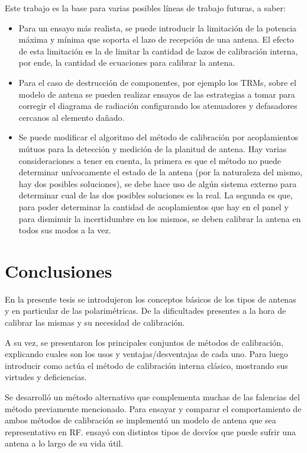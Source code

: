 Este trabajo es la base para varias posibles líneas de trabajo futuras, a saber:
\begin{itemize}
	\item Para un ensayo más realista, se puede introducir la limitación de la potencia máxima y mínima que soporta el lazo 
		de recepción de una antena. El efecto de esta limitación es la de limitar la cantidad de lazos de calibración interna, 
		por ende, la cantidad de ecuaciones para calibrar la antena.
	\item Para el caso de destrucción de componentes, por ejemplo los TRMs, sobre el modelo de antena se pueden realizar ensayos 
		de las estrategias a tomar para corregir el diagrama de radiación configurando los atenuadores y defasadores cercanos al 
		elemento dañado.
	\item Se puede modificar el algoritmo del método de calibración por acoplamientos mútuos para la detección y medición de 
		la planitud de antena. Hay varias consideraciones a tener en cuenta, la primera es que el método no puede determinar 
		unívocamente el estado de la antena (por la naturaleza del mismo, hay dos posibles soluciones), se debe hace uso de algún 
		sistema externo para determinar cual de las dos posibles soluciones es la real. La segunda es que, para poder determinar
		la cantidad de acoplamientos que hay en el panel y para disminuir la incertidumbre en los mismos, se deben calibrar la 
		antena en todos sus modos a la vez.
\end{itemize}

\section{Conclusiones}

En la presente tesis se introdujeron los conceptos básicos de los tipos de antenas y en particular de las polarimétricas. De 
la dificultades presentes a la hora de calibrar las mismas y su necesidad de calibración.

A su vez, se presentaron los principales conjuntos de métodos de calibración, explicando cuales son los usos y 
ventajas/desventajas de cada uno. Para luego introducir como actúa el método de calibración interna clásico, mostrando sus 
virtudes y deficiencias. 

Se desarrolló un método alternativo que complementa muchas de las falencias del método previamente mencionado. Para ensayar 
y comparar el comportamiento de ambos métodos de calibración se implementó un modelo de antena que sea representativo en RF.
ensayó con distintos tipos de desvíos que puede sufrir una antena a lo largo de su vida útil.
